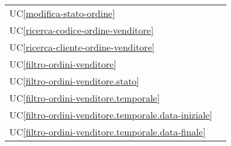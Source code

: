 \begin{longtable}{C{6cm} C{6cm}}
    UC\ref{modifica-stato-ordine} &  \\

	UC\ref{ricerca-codice-ordine-venditore} &  \\

    UC\ref{ricerca-cliente-ordine-venditore} &  \\

	UC\ref{filtro-ordini-venditore} &  \\

    UC\ref{filtro-ordini-venditore.stato} &  \\

	UC\ref{filtro-ordini-venditore.temporale} &  \\

    UC\ref{filtro-ordini-venditore.temporale.data-iniziale} &  \\

	UC\ref{filtro-ordini-venditore.temporale.data-finale} &  \\


\end{longtable}
